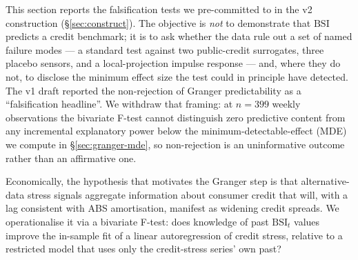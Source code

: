 \documentclass[11pt,letterpaper]{article}
\newcommand{\bsi}{\text{BSI}}
\begin{document}
This section reports the falsification tests we pre-committed to in the
v2 construction (\S\ref{sec:construct}). The objective is \emph{not}
to demonstrate that $\bsi$ predicts a credit benchmark; it is to ask
whether the data rule out a set of named failure modes --- a standard
\citet{granger1969investigating} test against two public-credit
surrogates, three placebo sensors, and a local-projection impulse
response --- and, where they do not, to disclose the minimum effect
size the test could in principle have detected. The v1 draft reported
the non-rejection of Granger predictability as a ``falsification
headline''. We withdraw that framing: at $n=399$ weekly observations
the bivariate F-test cannot distinguish zero predictive content from
any incremental explanatory power below the minimum-detectable-effect
(MDE) we compute in \S\ref{sec:granger-mde}, so non-rejection is an
uninformative outcome rather than an affirmative one.

Economically, the hypothesis that motivates the Granger step is that
alternative-data stress signals aggregate information about consumer
credit that will, with a lag consistent with ABS amortisation, manifest
as widening credit spreads. We operationalise it via a bivariate
F-test: does knowledge of past $\bsi_t$ values improve the in-sample
fit of a linear autoregression of credit stress, relative to a
restricted model that uses only the credit-stress series' own past?
\end{document}

